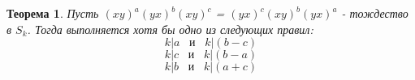 \documentclass{article}
\newtheorem{theorem}{Теорема}
\begin{document}
	\begin{theorem}
		 Пусть $(xy)^a(yx)^b(xy)^c$ = $(yx)^c(xy)^b(yx)^a$ - тождество в $S_k$. Тогда выполняется хотя бы одно из следующих правил:
		 \begin{equation*}
		 k|a \hspace{10pt} \text{и} \hspace{10pt} k|(b-c)
		 \end{equation*}
		 \begin{equation*}
		 k|c \hspace{10pt} \text{и} \hspace{10pt} k|(b-a)
		 \end{equation*}
		 \begin{equation*}
		 k|b \hspace{10pt} \text{и} \hspace{10pt} k|(a+c)
		 \end{equation*}
	\end{theorem}
\end{document}
